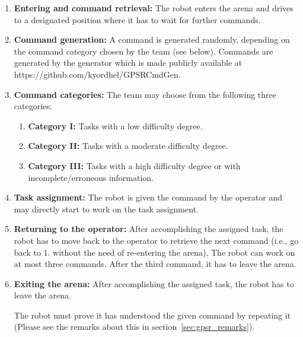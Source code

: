 \begin{enumerate}
	\item \textbf{Entering and command retrieval:} The robot enters the arena and drives to a designated position where it has to wait for further commands.

	\item \textbf{Command generation:} A command is generated randomly, depending on the command category chosen by the team (see below). Commands are generated by the generator which is made publicly available at https://github.com/kyordhel/GPSRCmdGen. \\

	\item \textbf{Command categories:} The team may choose from the following three categories:
	\begin{enumerate}
		\item \textbf{Category I:} Tasks with a low difficulty degree.
		\item \textbf{Category II:} Tasks with a moderate difficulty degree.
		\item \textbf{Category III:} Tasks with a high difficulty degree or with incomplete/erroneous information.
	\end{enumerate}

	\item \textbf{Task assignment:} The robot is given the command by the operator and may directly start to work on the task assignment.

	\item \textbf{Returning to the operator:} After accomplishing the assigned task, the robot has to move back to the operator to retrieve the next command (i.e., go back to 1. without the need of re-entering the arena). The robot can work on at most three commands. After the third command, it has to leave the arena.

	\item \textbf{Exiting the arena:} After accomplishing the assigned task, the robot has to leave the arena.

	The robot must prove it has understood the given command by repeating it (Please see the remarks about this in section~\ref{sec:gpsr_remarks}).
\end{enumerate}

